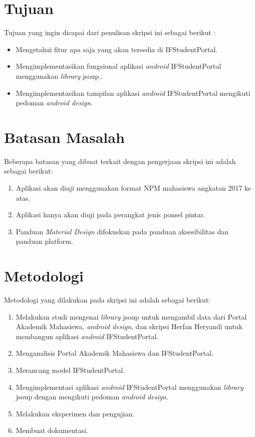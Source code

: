 \section{Tujuan}
\label{sec:tujuan}
Tujuan yang ingin dicapai dari penulisan skripsi ini sebagai berikut :
\begin{itemize}
    \item Mengetahui fitur apa saja yang akan tersedia di IFStudentPortal.
    \item Mengimplementasikan fungsional aplikasi \textit{android} IFStudentPortal menggunakan \textit{library} jsoup..
    \item Mengimplementasikan tampilan aplikasi \textit{android} IFStudentPortal mengikuti pedoman \textit{android design}.
    
\end{itemize}

\section{Batasan Masalah}
\label{sec:batasan}
Beberapa batasan yang dibuat terkait dengan pengerjaan skripsi ini adalah sebagai berikut:
\begin{enumerate}
	\item Aplikasi akan diuji menggunakan format NPM mahasiswa angkatan 2017 ke atas.
	\item Aplikasi hanya akan diuji pada perangkat jenis ponsel pintar.
    \item Panduan \textit{Material Design} difokuskan pada panduan aksesibilitas dan panduan platform.
\end{enumerate}

\section{Metodologi}
\label{sec:metlit}
Metodologi yang dilakukan pada skripsi ini adalah sebagai berikut:

\begin{enumerate}
	\item Melakukan studi mengenai \textit{library} jsoup untuk mengambil data dari Portal Akademik Mahasiswa, \textit{android design}, dan skripsi Herfan Heryandi untuk membangun aplikasi \textit{android} IFStudentPortal.
	\item Menganalisis Portal Akademik Mahasiswa dan IFStudentPortal.
	\item Merancang model IFStudentPortal.
	\item Mengimplementasi aplikasi \textit{android} IFStudentPortal menggunakan \textit{library} jsoup dengan mengikuti pedoman \textit{android design}.
	\item Melakukan eksperimen dan pengujian.
	\item Membuat dokumentasi.
\end{enumerate}



